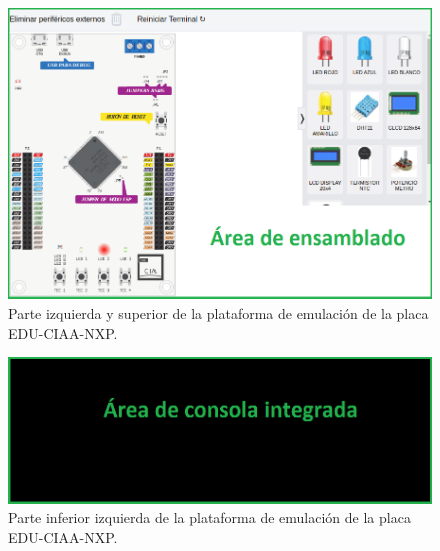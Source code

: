 \begin{figure}[ht]
	\centering
	\includegraphics[scale=.57]{./Figures/PlataformaEmulador1.png}
	\caption{Parte izquierda y superior de la plataforma de emulación de la placa EDU-CIAA-NXP.}
	\label{fig:PlataformaEmulador2}
\end{figure}


\begin{figure}[ht]
	\centering
	\includegraphics[scale=.58]{./Figures/PlataformaEmulador2.png}
	\caption{Parte inferior izquierda de la plataforma de emulación de la placa EDU-CIAA-NXP.}
	\label{fig:PlataformaEmulador3}
\end{figure}


\hfill \break
\hfill \break
\hfill \break
\hfill \break
\hfill \break
\hfill \break
\hfill \break


